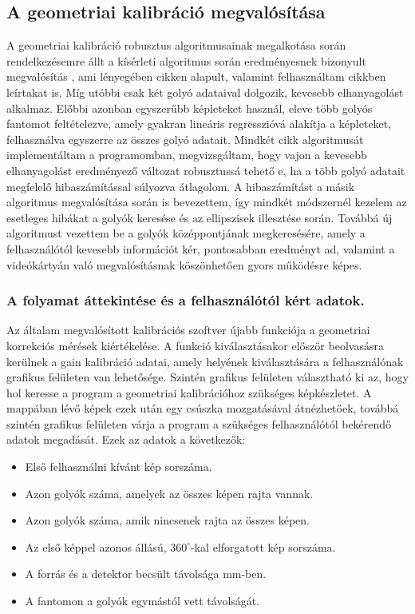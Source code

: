 \documentclass[a4paper,12pt]{article}
\begin{document}
\subsection{A geometriai kalibráció megvalósítása}



A geometriai kalibráció robusztus algoritmusainak megalkotása során rendelkezésemre állt a kísérleti algoritmus során eredményesnek bizonyult megvalósítás \cite{botond}, ami lényegében  cikken alapult,  valamint felhasználtam   cikkben leírtakat is. Míg utóbbi csak két golyó adataival dolgozik, kevesebb elhanyagolást alkalmaz. Előbbi azonban egyszerűbb képleteket használ, eleve több golyós fantomot feltételezve, amely gyakran lineáris regresszióvá alakítja a képleteket, felhasználva egyszerre az összes golyó adatait. Mindkét cikk algoritmusát implementáltam a programomban, megvizsgáltam, hogy vajon a kevesebb elhanyagolást eredményező változat robusztussá tehető e, ha a több golyó adatait megfelelő hibaszámítással súlyozva átlagolom. A hibaszámítást a másik algoritmus megvalósítása során is bevezettem, így mindkét módszernél kezelem az esetleges hibákat a golyók keresése és az ellipszisek illesztése során. Továbbá új algoritmust vezettem be a golyók középpontjának megkeresésére, amely a felhasználótól kevesebb információt kér, pontosabban eredményt ad, valamint a videókártyán való megvalósításnak köszönhetően gyors működésre képes.


\subsubsection{ A folyamat áttekintése és a felhasználótól kért adatok. }


Az általam megvalósított kalibrációs szoftver újabb funkciója a geometriai korrekciós mérések kiértékelése. A funkció kiválasztásakor először beolvasásra kerülnek a gain kalibráció adatai, amely helyének kiválasztására a felhasználónak grafikus felületen van lehetősége. Szintén grafikus felületen választható ki az, hogy hol keresse a program a geometriai kalibrációhoz szükséges képkészletet. A mappában lévő képek ezek után egy csúszka mozgatásával átnézhetőek, továbbá szintén grafikus felületen várja a program a szükséges felhasználótól bekérendő adatok megadását. Ezek az adatok a következők:

\begin{itemize}
  \item Első felhasználni kívánt kép sorszáma.
  \item Azon golyók száma, amelyek az összes képen rajta vannak.
  \item Azon golyók száma, amik nincsenek rajta az összes képen.
  \item Az első képpel azonos állású, $360^\circ$-kal elforgatott kép sorszáma.
  \item A forrás és a detektor becsült távolsága mm-ben.
    \item A fantomon a golyók egymástól vett távolságát.
\end{itemize}
\end{document}
